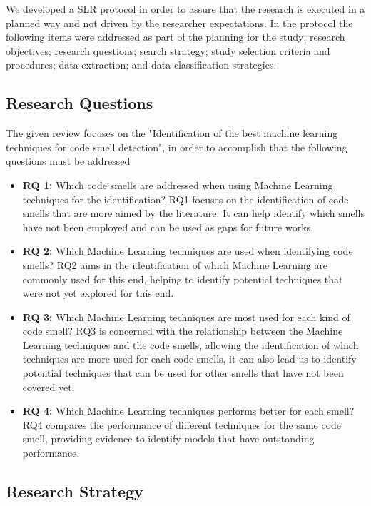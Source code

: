 We developed a SLR protocol in order to assure that the research is executed in a planned way and not driven by the researcher expectations. In the protocol the following items were addressed as part of the planning for the study: research objectives; research questions; search strategy; study selection criteria and procedures; data extraction; and data classification strategies.

\subsection{Research Questions}

 The given review focuses on the "Identification of the best machine learning techniques for code smell detection", in order to accomplish that the following questions must be addressed

\begin{itemize}
    \item \textbf{RQ 1:} Which code smells are addressed when using Machine Learning techniques for the identification?
    RQ1 focuses on the identification of code smells that are more aimed by the literature. It can help identify which smells have not been employed and can be used as gaps for future works.
    \item \textbf{RQ 2:} Which Machine Learning techniques are used when identifying code smells?
    RQ2 aims in the identification of which Machine Learning are commonly used for this end, helping to identify potential techniques that were not yet explored for this end.
    \item \textbf{RQ 3:} Which Machine Learning techniques are most used for each kind of code smell?
    RQ3 is concerned with the relationship between the Machine Learning techniques and the code smells, allowing the identification of which techniques are more used for each code smells, it can also lead us to identify potential techniques that can be used for other smells that have not been covered yet.
    \item \textbf{RQ 4:} Which Machine Learning techniques performs better for each smell?
    RQ4 compares the performance of different techniques for the same code smell, providing evidence to identify models that have outstanding performance.
\end{itemize}

\subsection{Research Strategy}

